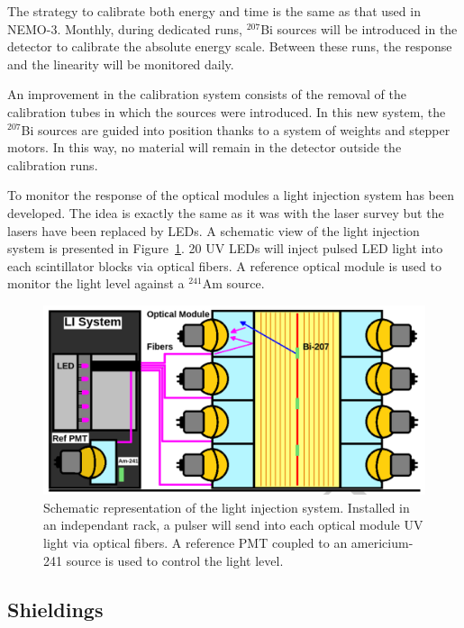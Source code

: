 \documentclass[main.tex]{subfiles}
\begin{document}
\NI The strategy to calibrate both energy and time is the same as that used in NEMO-3. Monthly, during dedicated runs, $^{\text{207}}$Bi sources will be introduced in the detector to calibrate the absolute energy scale. Between these runs, the response and the linearity will be monitored daily. 


\bigskip


\NI An improvement in the calibration system consists of the removal of the calibration tubes in which the sources were introduced. In this new system, the $^{\text{207}}$Bi sources are guided into position thanks to a system of weights and stepper motors. In this way, no material will remain in the detector outside the calibration runs.


\bigskip


\NI To monitor the response of the optical modules a light injection system has been developed. The idea is exactly the same as it was with the laser survey but the lasers have been replaced by LEDs. A schematic view of the light injection system is presented in Figure~\ref{LIschema}. 20 UV LEDs will inject pulsed LED light into each scintillator blocks via optical fibers. A reference optical module is used to monitor the light level against a $^{\text{241}}$Am source.


\bigskip
\begin{figure}[h!]
\begin{center}
\includegraphics[scale=0.3]{pictures/Chap3/LIschema.png}
\caption{Schematic representation of the light injection system. Installed in an independant rack, a pulser will send into each optical module UV light via optical fibers. A reference PMT coupled to an americium-241 source is used to control the light level.}
\label{LIschema}
\end{center}
\end{figure}


\subsection{Shieldings}
\end{document}
